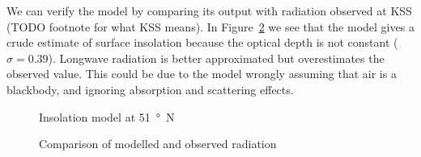 \documentclass[a4paper,titlepage]{article}
\begin{document}
We can verify the model by comparing its output with radiation observed at KSS (TODO footnote for what KSS means).  In Figure~\ref{fig:toa-model-verification} we see that the model gives a crude estimate of surface insolation because the optical depth is not constant ($\sigma=0.39$).  Longwave radiation is better approximated but overestimates the observed value.  This could be due to the model wrongly assuming that air is a blackbody, and ignoring absorption and scattering effects.

\begin{figure}
\centering

\caption{Insolation model at \SI{51}{\degree N}}
\label{fig:toa-model}
\end{figure}

\begin{figure}
\centering

\caption{Comparison of modelled and observed radiation}
\label{fig:toa-model-verification}
\end{figure}
\end{document}
